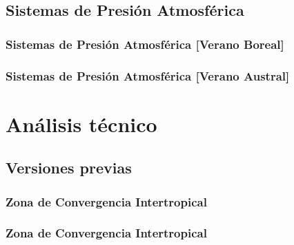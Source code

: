 \documentclass{beamer}
\newtheorem{Th1}{Reseña Historica}
\begin{document}
	\subsection{Sistemas de Presión Atmosférica}
	\begin{frame}
		\frametitle{Sistemas de Presión Atmosférica [Verano Boreal]}
		\begin{figure}[!hbt]
		   \centering
		\end{figure}
	\end{frame} 

	\begin{frame}
		\frametitle{Sistemas de Presión Atmosférica [Verano Austral]}
		\begin{figure}[!hbt]
		   \centering
		\end{figure}
	\end{frame} 

	\section{Análisis técnico}
	\subsection{Versiones previas}
	\begin{frame}
		\frametitle{Zona de Convergencia Intertropical}
		\begin{figure}[!hbt]
		   \centering
		\end{figure}
	\end{frame} 

	\begin{frame}
		\frametitle{Zona de Convergencia Intertropical}
		\begin{figure}[!hbt]
		   \centering
		\end{figure}
	\end{frame}

\end{document}
